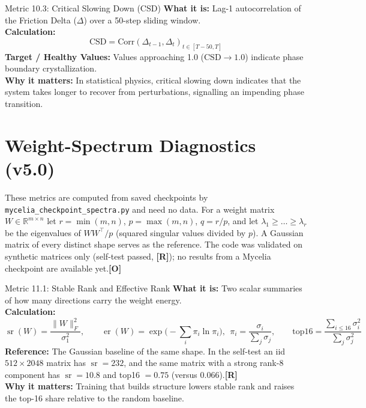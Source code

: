\documentclass[11pt,a4paper]{article}
\newcommand{\sR}{\textbf{[R]}}
\newcommand{\sO}{\textbf{[O]}}
\begin{document}
\begin{metricbox}{Metric 10.3: Critical Slowing Down (CSD)}
\textbf{What it is:} Lag-1 autocorrelation of the Friction Delta ($\Delta$) over a 50-step sliding window.\\
\textbf{Calculation:} 
 $$\text{CSD} = \text{Corr}\left(\Delta_{t-1}, \Delta_t\right)_{t \in [T-50, T]}$$ \textbf{Target / Healthy Values:} Values approaching 1.0 ($\text{CSD} \to 1.0$) indicate phase boundary crystallization.\\
\textbf{Why it matters:} In statistical physics, critical slowing down indicates that the system takes longer to recover from perturbations, signalling an impending phase transition.
\end{metricbox}

\section{Weight-Spectrum Diagnostics (v5.0)}\label{sec:spectra}

These metrics are computed from saved checkpoints by \texttt{mycelia\_checkpoint\_spectra.py} and need no data. For a weight matrix $W \in \mathbb{R}^{m\times n}$ let $r = \min(m,n)$, $p = \max(m,n)$, $q = r/p$, and let $\lambda_1 \ge \dots \ge \lambda_r$ be the eigenvalues of $W W^\top / p$ (squared singular values divided by $p$). A Gaussian matrix of every distinct shape serves as the reference. The code was validated on synthetic matrices only (self-test passed, \sR{}); no results from a Mycelia checkpoint are available yet.\sO{}

\begin{metricbox}{Metric 11.1: Stable Rank and Effective Rank}
\textbf{What it is:} Two scalar summaries of how many directions carry the weight energy.\\
\textbf{Calculation:}
$$\operatorname{sr}(W) = \frac{\|W\|_F^2}{\sigma_1^2}, \qquad \operatorname{er}(W) = \exp\!\Big(-\sum_i \pi_i \ln \pi_i\Big),\ \ \pi_i = \frac{\sigma_i}{\sum_j \sigma_j}, \qquad \text{top16} = \frac{\sum_{i\le 16}\sigma_i^2}{\sum_j \sigma_j^2}$$
\textbf{Reference:} The Gaussian baseline of the same shape. In the self-test an iid $512\times2048$ matrix has $\operatorname{sr} = 232$, and the same matrix with a strong rank-8 component has $\operatorname{sr} = 10.8$ and top16 $= 0.75$ (versus $0.066$).\sR{}\\
\textbf{Why it matters:} Training that builds structure lowers stable rank and raises the top-16 share relative to the random baseline.
\end{metricbox}
\end{document}
